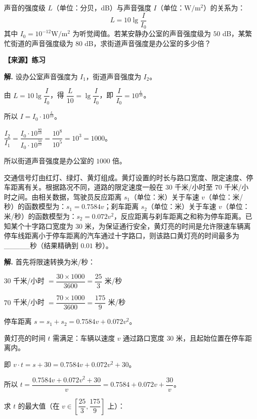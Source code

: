 \documentclass[11pt]{ctexrep}
\begin{document}
\begin{example}[声音强度]
    声音的强度级 $L$（单位：分贝，dB）与声音强度 $I$（单位：$\mathrm{W/m^2}$）的关系为：
    \[
        L = 10 \lg \dfrac{I}{I_0}
    \]
    其中 $I_0 = 10^{-12} \mathrm{W/m^2}$ 为听觉阈值。若某安静办公室的声音强度级为 $50$ dB，某繁忙街道的声音强度级为 $80$ dB，求街道声音强度是办公室的多少倍？
    
    \textbf{【来源】练习}
\end{example}

\textbf{解.} 设办公室声音强度为 $I_1$，街道声音强度为 $I_2$。

由 $L = 10 \lg \dfrac{I}{I_0}$，得 $\dfrac{L}{10} = \lg \dfrac{I}{I_0}$，即 $\dfrac{I}{I_0} = 10^{\frac{L}{10}}$。

所以 $I = I_0 \cdot 10^{\frac{L}{10}}$。

$\dfrac{I_2}{I_1} = \dfrac{I_0 \cdot 10^{\frac{80}{10}}}{I_0 \cdot 10^{\frac{50}{10}}} = \dfrac{10^8}{10^5} = 10^3 = 1000$。

所以街道声音强度是办公室的 $1000$ 倍。

\begin{realexam}[2025 松江一模]
    交通信号灯由红灯、绿灯、黄灯组成。黄灯设置的时长与路口宽度、限定速度、停车距离有关。根据路况不同，道路的限定速度一般在 $30$ 千米/小时至 $70$ 千米/小时之间。由相关数据，驾驶员反应距离 $s_1$（单位：米）关于车速 $v$（单位：米/秒）的函数模型为：$s_1 = 0.7584v$；刹车距离 $s_2$（单位：米）关于车速 $v$（单位：米/秒）的函数模型为：$s_2 = 0.072v^2$，反应距离与刹车距离之和称为停车距离。已知某个十字路口宽度为 $30$ 米，为保证通行安全，黄灯亮的时间是允许限速车辆离停车线距离小于停车距离的汽车通过十字路口，则该路口黄灯亮的时间最多为\_\_\_\_\_秒（结果精确到 $0.01$ 秒）。
\end{realexam}

\textbf{解.} 首先将限速转换为米/秒：

$30$ 千米/小时 $= \dfrac{30 \times 1000}{3600} = \dfrac{25}{3}$ 米/秒

$70$ 千米/小时 $= \dfrac{70 \times 1000}{3600} = \dfrac{175}{9}$ 米/秒

停车距离 $s = s_1 + s_2 = 0.7584v + 0.072v^2$。

黄灯亮的时间 $t$ 需满足：车辆以速度 $v$ 通过路口宽度 $30$ 米，且起始位置在停车距离内。

即 $v \cdot t = s + 30 = 0.7584v + 0.072v^2 + 30$。

所以 $t = \dfrac{0.7584v + 0.072v^2 + 30}{v} = 0.7584 + 0.072v + \dfrac{30}{v}$。

求 $t$ 的最大值（在 $v \in \left[\dfrac{25}{3}, \dfrac{175}{9}\right]$ 上）：
\end{document}
